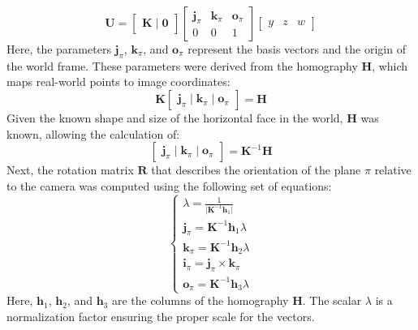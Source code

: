 \documentclass{Academic}
\begin{document}
\begin{equation}
\mathbf{U} =\begin{bmatrix}
    \mathbf{K} \mid  \mathbf{0}
\end{bmatrix}
\begin{bmatrix}
    \mathbf{j}_\pi & \mathbf{k}_\pi & \mathbf{o}_\pi \\ 0 & 0 & 1
\end{bmatrix}
\begin{bmatrix}
    y & z & w
\end{bmatrix}
\end{equation}
Here, the parameters $\mathbf{j}_\pi$, $\mathbf{k}_\pi$, and $\mathbf{o}_\pi$ represent the basis vectors and the origin of the world frame. 
These parameters were derived from the homography $\mathbf{H}$, which maps real-world points to image coordinates:
\begin{equation}\mathbf{K}\begin{bmatrix}
    \mathbf{j}_\pi \mid \mathbf{k}_\pi \mid \mathbf{o}_\pi
\end{bmatrix}=\mathbf{H}\end{equation}
Given the known shape and size of the horizontal face in the world, $\mathbf{H}$ was known, allowing the calculation of:
\begin{equation}\begin{bmatrix}
    \mathbf{j}_\pi \mid \mathbf{k}_\pi \mid \mathbf{o}_\pi
\end{bmatrix} = \mathbf{K}^{-1}\mathbf{H} \end{equation}
Next, the rotation matrix $\mathbf{R}$ that describes the orientation of the plane $\pi$ relative to the camera was computed using the following set of equations:
\begin{equation}\begin{cases}
    \lambda = \frac{1}{\lvert \mathbf{K}^{-1} \mathbf{h}_1 \rvert} \\
    \mathbf{j}_\pi = \mathbf{K}^{-1} \mathbf{h}_1 \lambda \\
    \mathbf{k}_\pi = \mathbf{K}^{-1} \mathbf{h}_2 \lambda \\
    \mathbf{i}_\pi = \mathbf{j}_\pi \times \mathbf{k}_\pi \\
    \mathbf{o}_\pi = \mathbf{K}^{-1} \mathbf{h}_3 \lambda
\end{cases}\end{equation}
Here, $\mathbf{h}_1$, $\mathbf{h}_2$, and $\mathbf{h}_3$ are the columns of the homography $\mathbf{H}$. The scalar $\lambda$ is a normalization factor ensuring the proper scale for the vectors.
\end{document}
